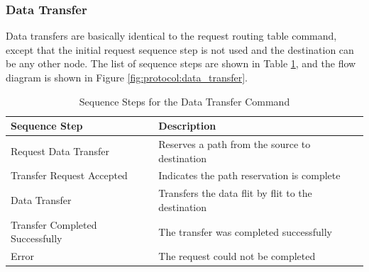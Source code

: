 \subsubsection{Data Transfer}\label{ref:protocol:methodology:commands:data_transfer}

Data transfers are basically identical to the request routing table command, except that the initial request sequence step is not used and the destination can be any other node. The list of sequence steps are shown in Table \ref{tab:protocol:data_transfer}, and the flow diagram is shown in Figure \ref{fig:protocol:data_transfer}.

\begin{table}
	\begin{center}
		\setlength{\extrarowheight}{1.5pt}
		\caption{Sequence Steps for the Data Transfer Command}
		\vspace{0.1cm}
		\begin{tabular} {|l|l|}
			\hline
			\textbf{Sequence Step} & \textbf{Description} \\
			\hline
			\hline
			Request Data Transfer & Reserves a path from the source to destination \\
			\hline
			Transfer Request Accepted & Indicates the path reservation is complete \\
			\hline
			Data Transfer & Transfers the data flit by flit to the destination \\
			\hline
			Transfer Completed Successfully & The transfer was completed successfully \\
			\hline
			Error & The request could not be completed \\
			\hline
		\end{tabular}
		\label{tab:protocol:data_transfer}
	\end{center}
\end{table}

